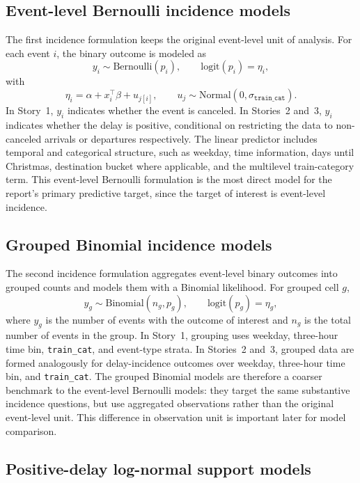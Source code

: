 \documentclass[12pt]{article}
\begin{document}
\subsection{Event-level Bernoulli incidence models}

The first incidence formulation keeps the original event-level unit of analysis. For each event \(i\), the binary outcome is modeled as
\[
y_i \sim \mathrm{Bernoulli}(p_i),
\qquad
\mathrm{logit}(p_i) = \eta_i ,
\]
with
\[
\eta_i = \alpha + x_i^\top \beta + u_{j[i]},
\qquad
u_j \sim \mathrm{Normal}(0, \sigma_{\texttt{train\_cat}}).
\]
In Story~1, \(y_i\) indicates whether the event is canceled. In Stories~2 and~3, \(y_i\) indicates whether the delay is positive, conditional on restricting the data to non-canceled arrivals or departures respectively. The linear predictor includes temporal and categorical structure, such as weekday, time information, days until Christmas, destination bucket where applicable, and the multilevel train-category term. This event-level Bernoulli formulation is the most direct model for the report's primary predictive target, since the target of interest is event-level incidence.

\subsection{Grouped Binomial incidence models}

The second incidence formulation aggregates event-level binary outcomes into grouped counts and models them with a Binomial likelihood. For grouped cell \(g\),
\[
y_g \sim \mathrm{Binomial}(n_g, p_g),
\qquad
\mathrm{logit}(p_g) = \eta_g ,
\]
where \(y_g\) is the number of events with the outcome of interest and \(n_g\) is the total number of events in the group. In Story~1, grouping uses weekday, three-hour time bin, \texttt{train\_cat}, and event-type strata. In Stories~2 and~3, grouped data are formed analogously for delay-incidence outcomes over weekday, three-hour time bin, and \texttt{train\_cat}. The grouped Binomial models are therefore a coarser benchmark to the event-level Bernoulli models: they target the same substantive incidence questions, but use aggregated observations rather than the original event-level unit. This difference in observation unit is important later for model comparison.

\subsection{Positive-delay log-normal support models}
\end{document}
